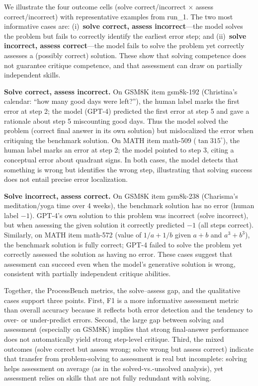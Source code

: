 
We illustrate the four outcome cells (solve correct/incorrect $\times$ assess correct/incorrect) with representative examples from run\_1. The two most informative cases are: (i)~\textbf{solve correct, assess incorrect}---the model solves the problem but fails to correctly identify the earliest error step; and (ii)~\textbf{solve incorrect, assess correct}---the model fails to solve the problem yet correctly assesses a (possibly correct) solution. These show that solving competence does not guarantee critique competence, and that assessment can draw on partially independent skills.

\textbf{Solve correct, assess incorrect.} On GSM8K item gsm8k-192 (Christina's calendar: ``how many good days were left?''), the human label marks the first error at step 2; the model (GPT-4) predicted the first error at step 5 and gave a rationale about step 5 miscounting good days. Thus the model solved the problem (correct final answer in its own solution) but mislocalized the error when critiquing the benchmark solution. On MATH item math-509 ($\tan 315^\circ$), the human label marks an error at step 2; the model pointed to step 3, citing a conceptual error about quadrant signs. In both cases, the model detects that something is wrong but identifies the wrong step, illustrating that solving success does not entail precise error localization.

\textbf{Solve incorrect, assess correct.} On GSM8K item gsm8k-238 (Charisma's meditation/yoga time over 4 weeks), the benchmark solution has no error (human label $-1$). GPT-4's own solution to this problem was incorrect (solve incorrect), but when assessing the given solution it correctly predicted $-1$ (all steps correct). Similarly, on MATH item math-572 (value of $1/a + 1/b$ given $a+b$ and $a^3+b^3$), the benchmark solution is fully correct; GPT-4 failed to solve the problem yet correctly assessed the solution as having no error. These cases suggest that assessment can succeed even when the model's generative solution is wrong, consistent with partially independent critique abilities.

Together, the ProcessBench metrics, the solve--assess gap, and the qualitative cases support three points. First, F1 is a more informative assessment metric than overall accuracy because it reflects both error detection and the tendency to over- or under-predict errors. Second, the large gap between solving and assessment (especially on GSM8K) implies that strong final-answer performance does not automatically yield strong step-level critique. Third, the mixed outcomes (solve correct but assess wrong; solve wrong but assess correct) indicate that transfer from problem-solving to assessment is real but incomplete: solving helps assessment on average (as in the solved-vs.-unsolved analysis), yet assessment relies on skills that are not fully redundant with solving.
